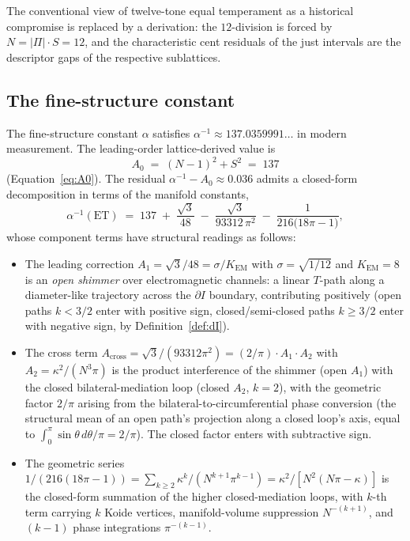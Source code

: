 \documentclass[11pt,a4paper]{article}
\theoremstyle{definition}
\theoremstyle{remark}
\begin{document}
The conventional view of twelve-tone equal temperament as a historical compromise is replaced by a derivation: the $12$-division is forced by $N=|\Pi|\cdot S=12$, and the characteristic cent residuals of the just intervals are the descriptor gaps of the respective sublattices.

\subsection{The fine-structure constant}\label{subsec:alpha}

The fine-structure constant $\alpha$ satisfies $\alpha^{-1}\approx 137.0359991\ldots$ in modern measurement. The leading-order lattice-derived value is
\[
A_{0} \;=\; (N-1)^{2}+S^{2} \;=\; 137
\]
(Equation~\ref{eq:A0}). The residual $\alpha^{-1}-A_{0} \approx 0.036$ admits a closed-form decomposition in terms of the manifold constants,
\begin{equation}\label{eq:alpha}
\alpha^{-1}(\mathrm{ET}) \;=\; 137 \;+\; \frac{\sqrt{3}}{48} \;-\; \frac{\sqrt{3}}{93312\,\pi^{2}} \;-\; \frac{1}{216\bigl(18\pi - 1\bigr)},
\end{equation}
whose component terms have structural readings as follows:
\begin{itemize}[leftmargin=*]
\item The leading correction $A_{1} = \sqrt{3}/48 = \sigma/K_{\mathrm{EM}}$ with $\sigma = \sqrt{1/12}$ and $K_{\mathrm{EM}} = 8$ is an \emph{open shimmer} over electromagnetic channels: a linear $T$-path along a diameter-like trajectory across the $\partial I$ boundary, contributing positively (open paths $k<3/2$ enter with positive sign, closed/semi-closed paths $k\ge 3/2$ enter with negative sign, by Definition~\ref{def:dI}).
\item The cross term $A_{\mathrm{cross}} = \sqrt{3}/(93312\pi^{2}) = (2/\pi)\cdot A_{1}\cdot A_{2}$ with $A_{2} = \kappa^{2}/(N^{3}\pi)$ is the product interference of the shimmer (open $A_{1}$) with the closed bilateral-mediation loop (closed $A_{2}$, $k=2$), with the geometric factor $2/\pi$ arising from the bilateral-to-circumferential phase conversion (the structural mean of an open path's projection along a closed loop's axis, equal to $\int_{0}^{\pi}\sin\theta\,d\theta/\pi = 2/\pi$). The closed factor enters with subtractive sign.
\item The geometric series $1/(216(18\pi-1)) = \sum_{k\ge 2}\kappa^{k}/(N^{k+1}\pi^{k-1}) = \kappa^{2}/[N^{2}(N\pi-\kappa)]$ is the closed-form summation of the higher closed-mediation loops, with $k$-th term carrying $k$ Koide vertices, manifold-volume suppression $N^{-(k+1)}$, and $(k-1)$ phase integrations $\pi^{-(k-1)}$.
\end{itemize}
\end{document}
